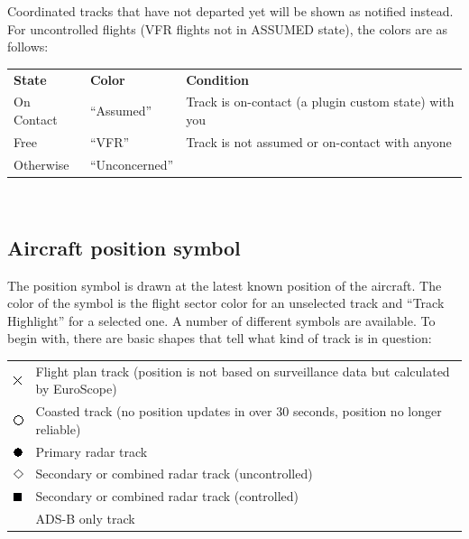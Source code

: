 \documentclass[11pt,a4paper,oldfontcommands]{memoir}
\begin{document}
Coordinated tracks that have not departed yet will be shown as notified instead.\\

For uncontrolled flights (VFR flights not in ASSUMED state), the colors are as follows:\\
\begin{tabular}{p{5cm}p{5cm}p{5cm}}
\textbf{State}  & \textbf{Color}    & \textbf{Condition}
\\On Contact    & “Assumed”         & Track is on-contact (a plugin custom state) with you
\\Free          & “VFR”             & Track is not assumed or on-contact with anyone
\\Otherwise     & “Unconcerned”     &
\end{tabular}\\

\subsection{Aircraft position symbol}
The position symbol is drawn at the latest known position of the aircraft. The color of the symbol is the
flight sector color for an unselected track and “Track Highlight” for a selected one. A number of different
symbols are available. To begin with, there are basic shapes that tell what kind of track is in question:\\

\begin{tabular}{p{5cm}p{5cm}}
\includegraphics{img/rps_fpasd.png} & Flight plan track (position is not based on surveillance data but calculated by EuroScope)
\\\includegraphics{img/rps_coast.png} & Coasted track (no position updates in over 30 seconds, position no longer reliable)
\\\includegraphics{img/rps_psr.png} & Primary radar track
\\\includegraphics{img/rps_sec.png} & Secondary or combined radar track (uncontrolled)
\\\includegraphics{img/rps_psr+ssr.png} & Secondary or combined radar track (controlled)
\\ & ADS-B only track
\end{tabular}\\
\end{document}

